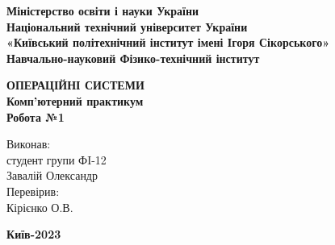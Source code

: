 \documentclass[a4paper,12pt]{article}
\begin{document}
    \pagestyle{fancy}
    \fancyhead{}
    \begin{center}
        \large{\textbf{Міністерство освіти і науки України\\
                Національний технічний університет України\\
                «Київський політехнічний інститут імені Ігоря Сікорського»\\
                Навчально-науковий Фізико-технічний інститут}}\\
        \hfill \break \hfill \break \hfill\break \hfill \break \hfill \break \hfill \break \hfill \break
        \hfill \break \hfill \break \hfill \break
        \begin{center}
            \normalsize{\textbf{ОПЕРАЦІЙНІ СИСТЕМИ\\
            Комп’ютерний практикум\\
            Робота №1}}
        \end{center}
    \end{center}
    \hfill \break \hfill \break \hfill \break \hfill \break \hfill \break \hfill \break \hfill \break
    \hfill \break \hfill \break \hfill \break \hfill \break 
    \begin{flushright}
        \large{ \hspace{35pt} Виконав:\\
            студент групи ФI-12\\
            Завалій Олександр\\} 
        \large{ \hspace{35pt} Перевірив:\\
        Кірієнко О.В.} 
    \end{flushright}
    \hfill \break \hfill \break \hfill \break \hfill \break \hfill \break \hfill \break \hfill \break
    \hfill \break
    \begin{center} \textbf{Київ-2023} \end{center}
    \thispagestyle{empty}
\end{document}
